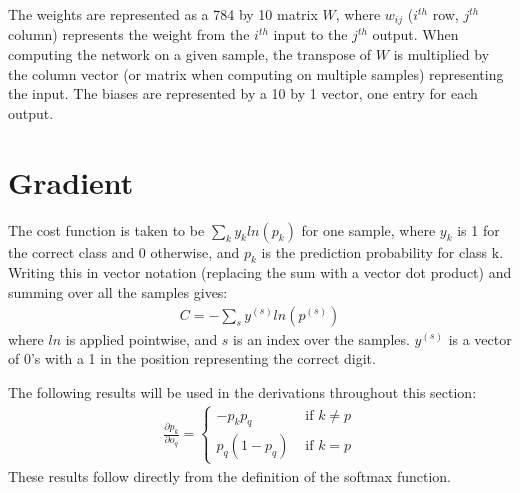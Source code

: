 \documentclass{article}
\begin{document}
   The weights are represented as a 784 by 10 matrix $W$, where $w_{ij}$ ($i^{th}$ row, $j^{th}$
   column) represents the weight from the $i^{th}$ input to the $j^{th}$ output.
   When computing the network on a given sample, the transpose of $W$ is multiplied
   by the column vector (or matrix when computing on multiple samples) representing the input.
   The biases are represented by a 10 by 1 vector, one entry for each output.

   \section{Gradient}
   The cost function is taken to be $\sum_{k} y_k ln(p_k)$ for one sample, where $y_k$ is
   1 for the correct class and 0 otherwise, and $p_k$ is the prediction probability for class k.
   Writing this in vector notation (replacing the sum with a vector dot product) and
   summing over all the samples gives:
      \begin{equation*} \begin{split}
         C = - \sum_{s} y^{(s)} ln(p^{(s)})
      \end{split} \end{equation*}
   where $ln$ is applied pointwise, and $s$ is an index over the samples. $y^{(s)}$ is
   a vector of 0's with a 1 in the position representing the correct digit.

   The following results will be used in the derivations throughout this section:
      \begin{equation*} \begin{split}
        \frac{ \partial p_k}{ \partial o_q } =
            \begin{cases}
               -p_k p_q       & \textrm{ if } k \neq p \\
               p_q (1 - p_q)  & \textrm{ if } k = p
            \end{cases}
      \end{split} \end{equation*}
   These results follow directly from the definition of the softmax function.
\end{document}
